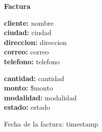 \documentclass{article}
\begin{document}
\begin{center}
    {\LARGE \textbf{Factura}}\\[1cm]
\end{center}

\textbf{cliente:} {nombre} \\
\textbf{ciudad:} {ciudad} \\
\textbf{direccion:} {direccion} \\
\textbf{correo:} {correo} \\
\textbf{telefono:} {telefono} \\

\vspace{0.5cm}

\textbf{cantidad:} {cantidad} \\
\textbf{monto:} \${monto} \\
\textbf{modalidad:} {modalidad} \\
\textbf{estado:} {estado} \\

\vspace{1cm}

Fecha de la factura: {timestamp}
\end{document}

